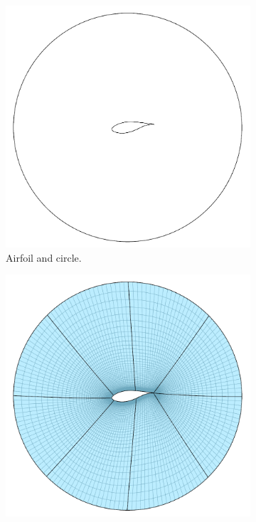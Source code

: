 \documentclass[3p,times,procedia]{elsarticle}
\begin{document}
\begin{figure}
  \centering
  \begin{subfigure}[b]{0.4\textwidth}
    \includegraphics[width=\textwidth]{figs/tfi-1}
    \caption{Airfoil and circle.}
    \label{fig:tfi:1}
  \end{subfigure}
  \begin{subfigure}[b]{0.4\textwidth}
    \includegraphics[width=\textwidth]{figs/tfi-2}

\end{subfigure}
\end{figure}
\end{document}
